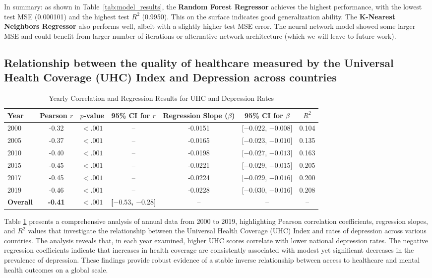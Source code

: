 In summary: as shown in Table~\ref{tab:model_results}, the \textbf{Random Forest Regressor} achieves the highest performance, with the lowest test MSE (0.000101) and the highest test $R^2$ (0.9950). 
This on the surface indicates good generalization ability. The \textbf{K-Nearest Neighbors Regressor} also performs well, albeit with a slightly higher test MSE error. The neural network model showed some larger MSE and could benefit from larger number of iterations or alternative network architecture (which we will leave to future work).

\subsection{Relationship between the quality of healthcare
measured by the Universal Health Coverage (UHC) Index and Depression across countries}

\begin{table}[h!]
\centering
\caption{Yearly Correlation and Regression Results for UHC and Depression Rates}
\label{tab:uhc_depression_results}
\begin{tabular}{|l|c|c|c|c|c|c|}
\hline
\textbf{Year} & \textbf{Pearson $r$} & \textbf{$p$-value} & \textbf{95\% CI for $r$} & \textbf{Regression Slope ($\beta$)} & \textbf{95\% CI for $\beta$} & \textbf{$R^2$} \\
\hline
2000 & -0.32 & $<.001$ & -- & -0.0151 & [$-0.022$, $-0.008$] & 0.104 \\
2005 & -0.37 & $<.001$ & -- & -0.0165 & [$-0.023$, $-0.010$] & 0.135 \\
2010 & -0.40 & $<.001$ & -- & -0.0198 & [$-0.027$, $-0.013$] & 0.163 \\
2015 & -0.45 & $<.001$ & -- & -0.0221 & [$-0.029$, $-0.015$] & 0.205 \\
2017 & -0.45 & $<.001$ & -- & -0.0224 & [$-0.029$, $-0.016$] & 0.200 \\
2019 & -0.46 & $<.001$ & -- & -0.0228 & [$-0.030$, $-0.016$] & 0.208 \\
\textbf{Overall} & \textbf{-0.41} & \textbf{$<.001$} & \textbf{[$-0.53$, $-0.28$]} & -- & -- & -- \\
\hline
\end{tabular}
\end{table}

Table \ref{tab:uhc_depression_results} presents a comprehensive analysis of annual data from 2000 to 2019, highlighting Pearson correlation coefficients, regression slopes, and $R^2$ values that investigate the relationship between the Universal Health Coverage (UHC) Index and rates of depression across various countries. The analysis reveals that, in each year examined, higher UHC scores correlate with lower national depression rates. The negative regression coefficients indicate that increases in health coverage are consistently associated with modest yet significant decreases in the prevalence of depression. These findings provide robust evidence of a stable inverse relationship between access to healthcare and mental health outcomes on a global scale.

